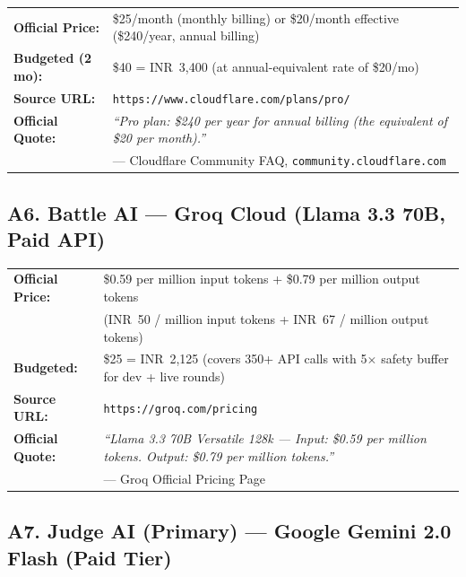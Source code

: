\documentclass[11pt, a4paper]{article}
\begin{document}
\begin{tcolorbox}[greenbox, title={Cloudflare Pro Plan --- Official Pricing}]
\begin{tabularx}{\linewidth}{@{}>{\bfseries}l X@{}}
Official Price:  & \$25/month (monthly billing) or \$20/month effective (\$240/year, annual billing) \\
Budgeted (2 mo): & \$40 = INR~3,400 (at annual-equivalent rate of \$20/mo) \\
Source URL:      & \texttt{https://www.cloudflare.com/plans/pro/} \\
Official Quote:  & \textit{``Pro plan: \$240 per year for annual billing (the equivalent of \$20 per month).''} \\
                 & --- Cloudflare Community FAQ, \texttt{community.cloudflare.com} \\
\end{tabularx}
\end{tcolorbox}

\subsection*{A6. Battle AI --- Groq Cloud (Llama 3.3 70B, Paid API)}

\begin{tcolorbox}[purplebox, title={Groq Paid API --- Llama 3.3 70B Versatile --- Official Pricing}]
\begin{tabularx}{\linewidth}{@{}>{\bfseries}l X@{}}
Official Price:  & \$0.59 per million input tokens + \$0.79 per million output tokens \\
                 & (INR~50 / million input tokens + INR~67 / million output tokens) \\
Budgeted:        & \$25 = INR~2,125 (covers 350+ API calls with 5$\times$ safety buffer for dev + live rounds) \\
Source URL:      & \texttt{https://groq.com/pricing} \\
Official Quote:  & \textit{``Llama 3.3 70B Versatile 128k --- Input: \$0.59 per million tokens. Output: \$0.79 per million tokens.''} \\
                 & --- Groq Official Pricing Page \\
\end{tabularx}
\end{tcolorbox}

\subsection*{A7. Judge AI (Primary) --- Google Gemini 2.0 Flash (Paid Tier)}
\end{document}
